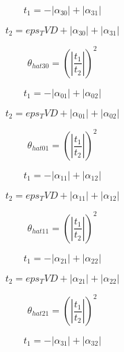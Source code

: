 \documentclass{article}
\begin{document}
\begin{dmath}t_{1} = - \left|{\alpha_{30}}\right| + \left|{\alpha_{31}}\right|\end{dmath}

\begin{dmath}t_{2} = eps_TVD + \left|{\alpha_{30}}\right| + \left|{\alpha_{31}}\right|\end{dmath}

\begin{dmath}\theta_{hat 30} = \left(\left|{\frac{t_{1}}{t_{2}}}\right| \right)^{2}\end{dmath}

\begin{dmath}t_{1} = - \left|{\alpha_{01}}\right| + \left|{\alpha_{02}}\right|\end{dmath}

\begin{dmath}t_{2} = eps_TVD + \left|{\alpha_{01}}\right| + \left|{\alpha_{02}}\right|\end{dmath}

\begin{dmath}\theta_{hat 01} = \left(\left|{\frac{t_{1}}{t_{2}}}\right| \right)^{2}\end{dmath}

\begin{dmath}t_{1} = - \left|{\alpha_{11}}\right| + \left|{\alpha_{12}}\right|\end{dmath}

\begin{dmath}t_{2} = eps_TVD + \left|{\alpha_{11}}\right| + \left|{\alpha_{12}}\right|\end{dmath}

\begin{dmath}\theta_{hat 11} = \left(\left|{\frac{t_{1}}{t_{2}}}\right| \right)^{2}\end{dmath}

\begin{dmath}t_{1} = - \left|{\alpha_{21}}\right| + \left|{\alpha_{22}}\right|\end{dmath}

\begin{dmath}t_{2} = eps_TVD + \left|{\alpha_{21}}\right| + \left|{\alpha_{22}}\right|\end{dmath}

\begin{dmath}\theta_{hat 21} = \left(\left|{\frac{t_{1}}{t_{2}}}\right| \right)^{2}\end{dmath}

\begin{dmath}t_{1} = - \left|{\alpha_{31}}\right| + \left|{\alpha_{32}}\right|\end{dmath}
\end{document}
